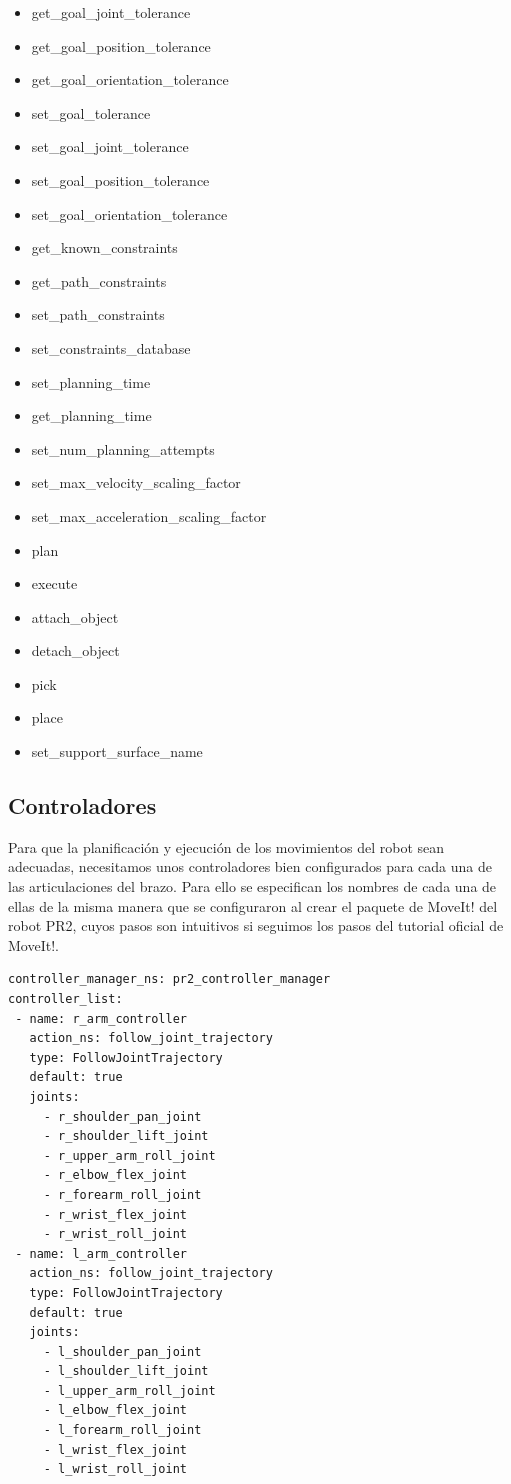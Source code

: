 \documentclass[12pt,spanish,chapterprefix, numbers=noenddot]{book}
\numberwithin{equation}{section}
\numberwithin{figure}{section}
\begin{document}
\begin{itemize}
\item get\_goal\_joint\_tolerance
\item get\_goal\_position\_tolerance
\item get\_goal\_orientation\_tolerance
\item set\_goal\_tolerance
\item set\_goal\_joint\_tolerance
\item set\_goal\_position\_tolerance
\item set\_goal\_orientation\_tolerance
\item get\_known\_constraints
\item get\_path\_constraints
\item set\_path\_constraints
\item set\_constraints\_database
\item set\_planning\_time
\item get\_planning\_time
\item set\_num\_planning\_attempts
\item set\_max\_velocity\_scaling\_factor
\item set\_max\_acceleration\_scaling\_factor
\item plan
\item execute
\item attach\_object
\item detach\_object
\item pick
\item place
\item set\_support\_surface\_name
\end{itemize}

\subsection{Controladores}
Para que la planificación y ejecución de los movimientos del robot sean adecuadas, necesitamos unos controladores bien configurados para cada una de las articulaciones del brazo. \cite{pr2_controllers}
Para ello se especifican los nombres de cada una de ellas de la misma manera que se configuraron al crear el paquete de MoveIt! del robot PR2, cuyos pasos son intuitivos si seguimos los pasos del tutorial oficial de MoveIt!. \cite{SetupAssistant}
\vspace{20pt}
	\begin{lstlisting}[frame=single] 
controller_manager_ns: pr2_controller_manager
controller_list:
 - name: r_arm_controller
   action_ns: follow_joint_trajectory
   type: FollowJointTrajectory
   default: true
   joints:
     - r_shoulder_pan_joint
     - r_shoulder_lift_joint
     - r_upper_arm_roll_joint
     - r_elbow_flex_joint
     - r_forearm_roll_joint
     - r_wrist_flex_joint
     - r_wrist_roll_joint
 - name: l_arm_controller
   action_ns: follow_joint_trajectory
   type: FollowJointTrajectory
   default: true
   joints:
     - l_shoulder_pan_joint
     - l_shoulder_lift_joint
     - l_upper_arm_roll_joint
     - l_elbow_flex_joint
     - l_forearm_roll_joint
     - l_wrist_flex_joint
     - l_wrist_roll_joint
    \end{lstlisting}
\end{document}
